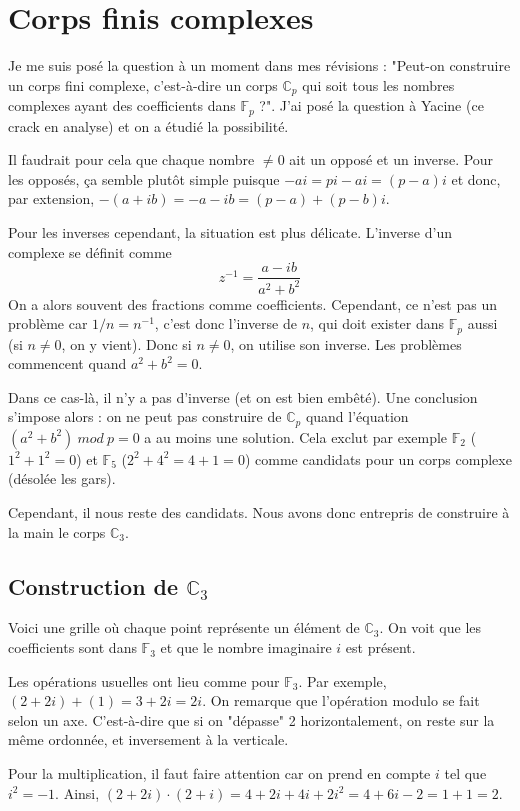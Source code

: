\documentclass[10pt,a4paper]{book}
\newcommand{\F}{\mathbb{F}}
\newcommand{\C}{\mathbb{C}}
\begin{document}
\chapter{Corps finis complexes}
Je me suis posé la question à un moment dans mes révisions : "Peut-on construire un corps fini complexe, c'est-à-dire un corps $\C_p$ qui soit tous les nombres complexes ayant des coefficients dans $\F_p$ ?". J'ai posé la question à Yacine (ce crack en analyse) et on a étudié la possibilité. \par 
Il faudrait pour cela que chaque nombre $\neq 0$ ait un opposé et un inverse. Pour les opposés, ça semble plutôt simple puisque $-ai = pi-ai = (p-a)i$ et donc, par extension, $-(a+ib)=-a-ib=(p-a)+(p-b)i$.\par 
Pour les inverses cependant, la situation est plus délicate. L'inverse d'un complexe se définit comme
\[z^{-1}=\frac{a-ib}{a^2+b^2}\]
On a alors souvent des fractions comme coefficients. Cependant, ce n'est pas un problème car $1/n = n^{-1}$, c'est donc l'inverse de $n$, qui doit exister dans $\F_p$ aussi (si $n\neq 0$, on y vient). Donc si $n\neq 0$, on utilise son inverse. Les problèmes commencent quand $a^2+b^2=0$.\par
Dans ce cas-là, il n'y a pas d'inverse (et on est bien embêté). Une conclusion s'impose alors : on ne peut pas construire de $\C_p$ quand l'équation $(a^2+b^2)\ mod\ p=0$ a au moins une solution. Cela exclut par exemple $\F_2$ ($1^2+1^2=0$) et $\F_5$ ($2^2+4^2=4+1=0$) comme candidats pour un corps complexe (désolée les gars). \par 
Cependant, il nous reste des candidats. Nous avons donc entrepris de construire à la main le corps $\C_3$.

\section{Construction de \texorpdfstring{$\C_3$}{C3}}
\begin{center}
\end{center}\par 
Voici une grille où chaque point représente un élément de $\C_3$. On voit que les coefficients sont dans $\F_3$ et que le nombre imaginaire $i$ est présent.\par 
Les opérations usuelles ont lieu comme pour $\F_3$. Par exemple, $(2+2i)+(1)=3+2i=2i$. On remarque que l'opération modulo se fait selon un axe. C'est-à-dire que si on "dépasse" 2 horizontalement, on reste sur la même ordonnée, et inversement à la verticale. \par 
Pour la multiplication, il faut faire attention car on prend en compte $i$ tel que $i^2=-1$. Ainsi, $(2+2i)\cdot(2+i)=4+2i+4i+2i^2=4+6i-2=1+1=2$.
\end{document}
